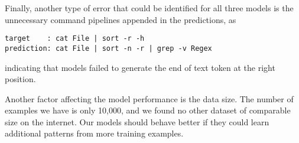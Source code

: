 Finally, another type of error that could be identified for all three models is the unnecessary command pipelines appended in the predictions, as
\begin{verbatim}
target    : cat File | sort -r -h 
prediction: cat File | sort -n -r | grep -v Regex
\end{verbatim}
indicating that models failed to generate the end of text token at the right position.

Another factor affecting the model performance is the data size. The number of examples we have is only 10,000, and we found no other dataset of comparable size on the internet. Our models should behave better if they could learn additional patterns from more training examples.